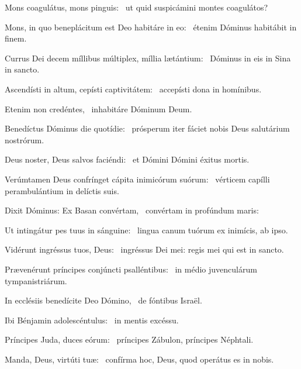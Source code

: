 \item Mons coagulátus, mons pinguis:~\psstar{} ut quid suspicámini montes coagulátos?

\item Mons, in quo beneplácitum est Deo habitáre in eo:~\psstar{} étenim Dóminus habitábit in finem.

\item Currus Dei decem míllibus múltiplex, míllia lætántium:~\psstar{} Dóminus in eis in Sina in sancto.

\item Ascendísti in altum, cepísti captivitátem:~\psstar{} accepísti dona in homínibus.

\item Etenim non credéntes,~\psstar{} inhabitáre Dóminum Deum.

\item Benedíctus Dóminus die quotídie:~\psstar{} prósperum iter fáciet nobis Deus salutárium nostrórum.

\item Deus noster, Deus salvos faciéndi:~\psstar{} et Dómini Dómini éxitus mortis.

\item Verúmtamen Deus confrínget cápita inimicórum suórum:~\psstar{} vérticem capílli perambulántium in delíctis suis.

\item Dixit Dóminus: Ex Basan convértam,~\psstar{} convértam in profúndum maris:

\item Ut intingátur pes tuus in sánguine:~\psstar{} lingua canum tuórum ex inimícis, ab ipso.

\item Vidérunt ingréssus tuos, Deus:~\psstar{} ingréssus Dei mei: regis mei qui est in sancto.

\item Prævenérunt príncipes conjúncti psalléntibus:~\psstar{} in médio juvenculárum tympanistriárum.

\item In ecclésiis benedícite Deo Dómino,~\psstar{} de fóntibus Israël.

\item Ibi Bénjamin adolescéntu\-lus:~\psstar{} in mentis excéssu.

\item Príncipes Juda, duces eórum:~\psstar{} príncipes Zábulon, príncipes Néphtali.

\item Manda, Deus, virtúti tuæ:~\psstar{} confírma hoc, Deus, quod operátus es in nobis.

